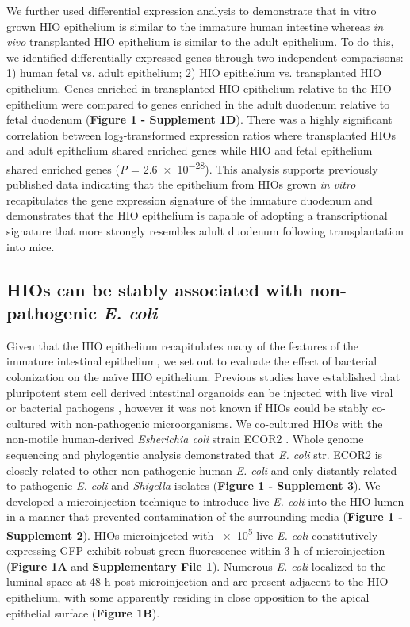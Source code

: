 \documentclass[9pt,lineo]{elife}
\begin{document}
We further used differential expression analysis to demonstrate that in vitro grown HIO epithelium is similar to the immature human intestine whereas \emph{in vivo} transplanted HIO epithelium is similar to the adult epithelium.  To do this, we identified differentially expressed genes through two independent comparisons: 1) human fetal vs. adult epithelium; 2) HIO epithelium vs. transplanted HIO epithelium. Genes enriched in transplanted HIO epithelium relative to the HIO epithelium were compared to genes enriched in the adult duodenum relative to fetal duodenum (\textbf{Figure 1 - Supplement 1D}). There was a highly significant correlation between log\(_{\text{2}}\)-transformed expression ratios where transplanted HIOs and adult epithelium shared enriched genes while HIO and fetal epithelium shared enriched genes  (\emph{P} = \num{2.6e-28}). This analysis supports previously published data indicating that the epithelium from HIOs grown \emph{in vitro} recapitulates the gene expression signature of the immature duodenum and demonstrates that the HIO epithelium is capable of adopting a transcriptional signature that more strongly resembles adult duodenum following transplantation into mice.

\subsection*{{\bfseries\sffamily } HIOs can be stably associated with non-pathogenic \emph{E. coli}}
\label{sec:orgheadline3}
Given that the HIO epithelium recapitulates many of the features of the immature intestinal epithelium, we set out to evaluate the effect of bacterial colonization on the na{\"i}ve HIO epithelium. Previous studies have established that pluripotent stem cell derived intestinal organoids can be injected with live viral \citep{Finkbeiner:2012} or bacterial pathogens \citep{Leslie:2015,Engevik:2015,Forbester:2015}, however it was not known if HIOs could be stably co-cultured with non-pathogenic microorganisms. We co-cultured HIOs with the non-motile human-derived \emph{Esherichia coli} strain ECOR2 \citep{Ochman:1984}. Whole genome sequencing and phylogentic analysis demonstrated that \emph{E. coli} str. ECOR2 is closely related to other non-pathogenic human \emph{E. coli} and only distantly related to pathogenic \emph{E. coli} and \emph{Shigella} isolates (\textbf{Figure 1 - Supplement 3}). We developed a microinjection technique to introduce live \emph{E. coli} into the HIO lumen in a manner that prevented contamination of the surrounding media (\textbf{Figure 1 - Supplement 2}). HIOs microinjected with \num{e5} live \emph{E. coli} constitutively expressing GFP exhibit robust green fluorescence within 3 h of microinjection (\textbf{Figure 1A} and \textbf{Supplementary File 1}). Numerous \emph{E. coli} localized to the luminal space at 48 h post-microinjection and are present adjacent to the HIO epithelium, with some apparently residing in close opposition to the apical epithelial surface (\textbf{Figure 1B}).
\end{document}
